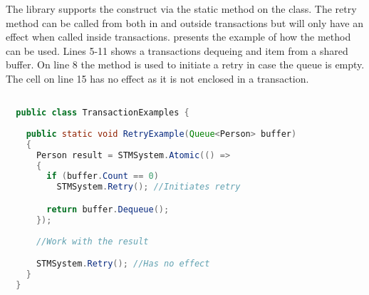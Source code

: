 The library supports the  construct via the static  method on the  class. The retry method can be called from both in and outside transactions but will only have an effect when called inside transactions.  presents the example of how the  method can be used. Lines 5-11 shows a transactions dequeing and item from a shared buffer. On line 8 the  method is used to initiate a retry in case the queue is empty. The cell on line 15 has no effect as it is not enclosed in a transaction.

\begin{lstlisting}[label=lst:library_retry,
  caption={Library \bscode{Retry}},
  language=Java,  
  showspaces=false,
  showtabs=false,
  breaklines=true,
  showstringspaces=false,
  breakatwhitespace=true,
  commentstyle=\color{greencomments},
  keywordstyle=\color{bluekeywords},
  stringstyle=\color{redstrings},
  morekeywords={atomic, retry, orElse, var, get, set}]  % Start your code-block

  public class TransactionExamples {
    
    public static void RetryExample(Queue<Person> buffer)
    {
      Person result = STMSystem.Atomic(() =>
      {
        if (buffer.Count == 0)
          STMSystem.Retry(); //Initiates retry

        return buffer.Dequeue();
      });
      
      //Work with the result

      STMSystem.Retry(); //Has no effect
    }
  }
\end{lstlisting}

